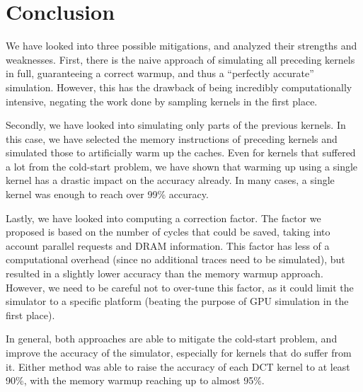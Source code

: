 \FloatBarrier
\section{Conclusion}\label{sec:mitigation-conclusion}

We have looked into three possible mitigations, and analyzed their strengths and weaknesses.
First, there is the naive approach of simulating all preceding kernels in full, guaranteeing a correct warmup, and thus a ``perfectly accurate'' simulation.
However, this has the drawback of being incredibly computationally intensive, negating the work done by sampling kernels in the first place.

Secondly, we have looked into simulating only parts of the previous kernels.
In this case, we have selected the memory instructions of preceding kernels and simulated those to artificially warm up the caches.
Even for kernels that suffered a lot from the cold-start problem, we have shown that warming up using a single kernel has a drastic impact on the accuracy already.
In many cases, a single kernel was enough to reach over 99\% accuracy.

Lastly, we have looked into computing a correction factor.
The factor we proposed is based on the number of cycles that could be saved, taking into account parallel requests and DRAM information.
This factor has less of a computational overhead (since no additional traces need to be simulated), but resulted in a slightly lower accuracy than the memory warmup approach.
However, we need to be careful not to over-tune this factor, as it could limit the simulator to a specific platform (beating the purpose of GPU simulation in the first place).

In general, both approaches are able to mitigate the cold-start problem, and improve the accuracy of the simulator, especially for kernels that do suffer from it.
Either method was able to raise the accuracy of each DCT kernel to at least 90\%, with the memory warmup reaching up to almost 95\%.